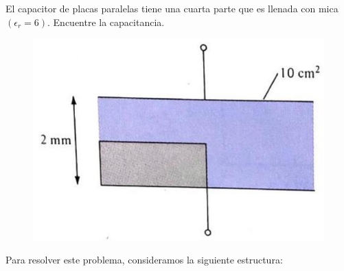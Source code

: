 \begin{problema}
    El capacitor de placas paralelas tiene una cuarta parte que es llenada con mica $\left(\epsilon_{r}=6\right)$. Encuentre la capacitancia.
\begin{figure}[H]
    \centering
    \includegraphics[scale=0.3]{imagenes/3.jpg}
\end{figure}
\begin{sol}
    Para resolver este problema, consideramos la siguiente estructura: 
    \begin{figure}[H]
        \centering 



\begin{tikzpicture}[x=0.75pt,y=0.75pt,yscale=-1,xscale=1]


\end{tikzpicture}
\end{figure}
\end{sol}
\end{problema}
